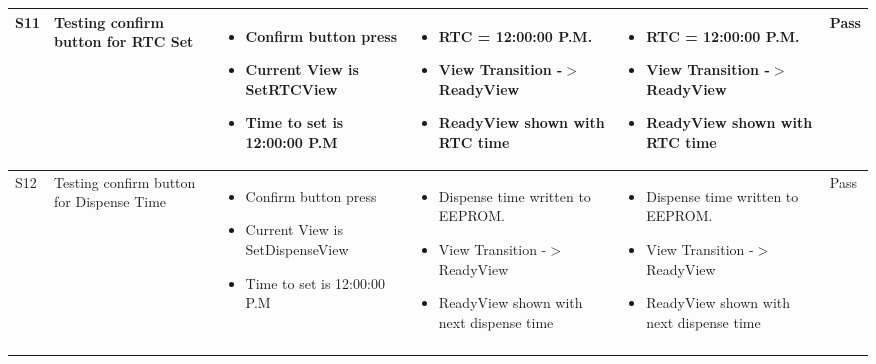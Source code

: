 \documentclass[12pt]{article}
\begin{document}
\begin{tabularx}{\textwidth}{|X|p{}|p{}|p{}|p{}|p{}|}
        \hline
        S11  &  Testing confirm button for RTC Set & 
        \begin{itemize}[leftmargin=*,topsep=0ex,parsep=0pt]
            \item Confirm button press
            \item Current View is SetRTCView
            \item Time to set is 12:00:00 P.M
        \end{itemize} &
        \begin{itemize}[leftmargin=*,topsep=0ex,parsep=0pt]
            \item RTC = 12:00:00 P.M.
            \item View Transition -$>$ ReadyView
            \item ReadyView shown with RTC time
        \end{itemize} & 
        \begin{itemize}[leftmargin=*,topsep=0ex,parsep=0pt]
            \item RTC = 12:00:00 P.M.
            \item View Transition -$>$ ReadyView
            \item ReadyView shown with RTC time
        \end{itemize} &Pass \\
        \hline
        
        
        \hline
        S12  &  Testing confirm button for Dispense Time & 
        \begin{itemize}[leftmargin=*,topsep=0ex,parsep=0pt]
            \item Confirm button press
            \item Current View is SetDispenseView
            \item Time to set is 12:00:00 P.M
        \end{itemize} &
        \begin{itemize}[leftmargin=*,topsep=0ex,parsep=0pt]
            \item Dispense time written to EEPROM.
            \item View Transition -$>$ ReadyView
            \item ReadyView shown with next dispense time
        \end{itemize} & 
        \begin{itemize}[leftmargin=*,topsep=0ex,parsep=0pt]
            \item Dispense time written to EEPROM.
            \item View Transition -$>$ ReadyView
            \item ReadyView shown with next dispense time
        \end{itemize} &Pass \\
        \hline
    \caption{SetTime Module Tests} %
    \end{tabularx}
    
\end{document}

